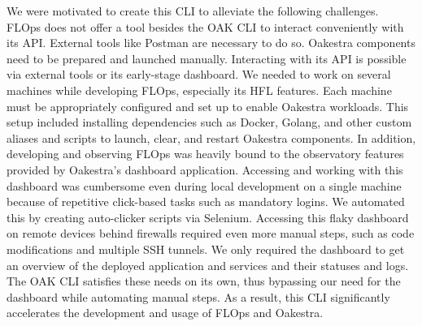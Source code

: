 We were motivated to create this CLI to alleviate the following challenges.
FLOps does not offer a tool besides the OAK CLI to interact conveniently with its API.
External tools like Postman are necessary to do so.
Oakestra components need to be prepared and launched manually.
Interacting with its API is possible via external tools or its early-stage dashboard.
We needed to work on several machines while developing FLOps, especially its HFL features.
Each machine must be appropriately configured and set up to enable Oakestra workloads.
This setup included installing dependencies such as Docker, Golang, and other custom aliases and scripts to launch, clear, and restart Oakestra components.
In addition, developing and observing FLOps was heavily bound to the observatory features provided by Oakestra's dashboard application.
Accessing and working with this dashboard was cumbersome even during local development on a single machine because of repetitive click-based tasks such as mandatory logins.
We automated this by creating auto-clicker scripts via Selenium.
Accessing this flaky dashboard on remote devices behind firewalls required even more manual steps, such as code modifications and multiple SSH tunnels.
We only required the dashboard to get an overview of the deployed application and services and their statuses and logs.
The OAK CLI satisfies these needs on its own, thus bypassing our need for the dashboard while automating manual steps.
As a result, this CLI significantly accelerates the development and usage of FLOps and Oakestra.






